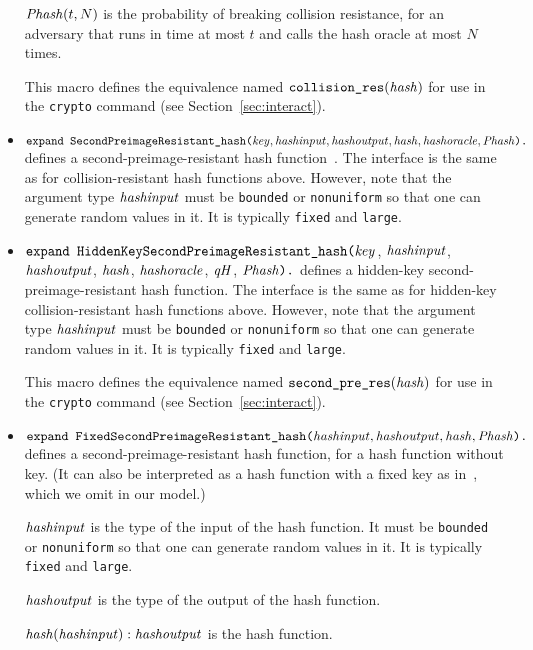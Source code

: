\documentclass{article}
\begin{document}
\begin{itemize}
   $\mathit{Phash}(t,N)$ is the probability of breaking collision resistance,
   for an adversary that runs in time at most $t$ and calls the hash oracle
   at most $N$ times.

   This macro defines the equivalence named
   $\texttt{collision\_res}(\mathit{hash})$ for use in the
   \texttt{crypto} command (see Section~\ref{sec:interact}).

\item $\texttt{expand SecondPreimageResistant\_hash(}\mathit{key}, \mathit{hashinput}, \mathit{hashoutput}, \mathit{hash}, \mathit{hashoracle}, \mathit{Phash}\texttt{).}$
defines a second-preimage-resistant hash function~\cite{Rogaway04}. The interface is the same as for collision-resistant hash functions above. However, note that the argument type $\mathit{hashinput}$ must be \texttt{bounded} or \texttt{nonuniform} so that one can generate random values in it. It is typically \texttt{fixed} and \texttt{large}.

\item $\texttt{expand HiddenKeySecondPreimageResistant\_hash(}\mathit{key}$, $\mathit{hashinput}$, $\mathit{hashoutput}$, $\mathit{hash}$, $\mathit{hashoracle}$, $\mathit{qH}$, $\mathit{Phash}\texttt{).}$
defines a hidden-key second-preimage-resistant hash function. The interface is the same as for hidden-key collision-resistant hash functions above. However, note that the argument type $\mathit{hashinput}$ must be \texttt{bounded} or \texttt{nonuniform} so that one can generate random values in it. It is typically \texttt{fixed} and \texttt{large}.

   This macro defines the equivalence named
   $\texttt{second\_pre\_res}(\mathit{hash})$ for use in the
   \texttt{crypto} command (see Section~\ref{sec:interact}).

\item $\texttt{expand FixedSecondPreimageResistant\_hash(}\mathit{hashinput}, \mathit{hashoutput}, \mathit{hash}, \mathit{Phash}\texttt{).}$
defines a second-preimage-resistant hash function, for a hash function without key. (It can also be interpreted as a hash function with a fixed key as in~\cite{Rogaway04}, which we omit in our model.)

$\mathit{hashinput}$ is the type of the input of the hash function. It
must be \texttt{bounded} or \texttt{nonuniform} so that one can
generate random values in it. It is typically \texttt{fixed} and
\texttt{large}.

   $\mathit{hashoutput}$ is the type of the output of the hash function.

   $\mathit{hash}(\mathit{hashinput}): \mathit{hashoutput}$ is the hash function.


\end{itemize}
\end{document}
